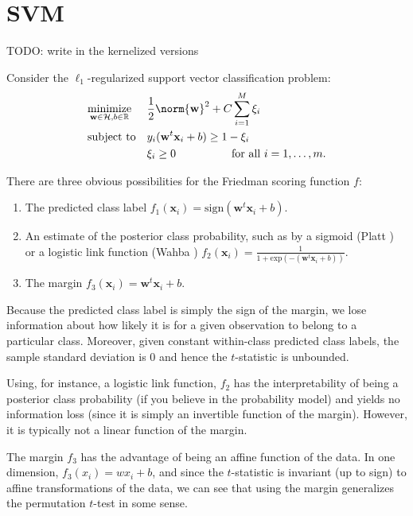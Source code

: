 \section{SVM}
TODO: write in the kernelized versions

Consider the $\ell_1$-regularized support vector classification problem:
\begin{equation*}
\begin{aligned}
& \underset{\mathbf{w} \in \mathcal{H}, b \in \mathbb{R}}{\text{minimize}}
& &\frac{1}{2}\norm{\mathbf{w}}^2+C\sum_{i=1}^M \xi_i \\
& \text{subject to}
& & y_i(\mathbf{w}^t \mathbf{x}_i + b) \geq 1 - \xi_i \\
&&& \xi_i \geq 0 \qquad \qquad \quad \text{for all } i=1,\ldots,m.
\end{aligned}
\end{equation*}

There are three obvious possibilities for the Friedman scoring
function $f$: 
\begin{enumerate}
\item The predicted class label $f_1(\mathbf{x}_i)
= \text{sign}(\mathbf{w}^t \mathbf{x}_i + b)$.
\item An estimate of the posterior class probability, such as by a
sigmoid (Platt \cite{platt1999probabilistic, lin2007note}) or a
logistic link function (Wahba \cite{wahba1992multivariate,
wahba1999support}) 
$f_2(\mathbf{x}_i) = \frac{1}{1 + \text{exp}(-(\mathbf{w}^t \mathbf{x}_i + b))}$.
\item The margin $f_3(\mathbf{x}_i) = \mathbf{w}^t \mathbf{x}_i + b$.
\end{enumerate}

Because the predicted class label is simply the sign of the margin, we
lose information about how likely it is for a given observation
to belong to a particular class.  Moreover, given constant within-class
predicted class labels, the sample standard deviation is $0$ and hence
the $t$-statistic is unbounded.

Using, for instance, a logistic link function, $f_2$ has the
interpretability of being a posterior class probability (if you
believe in the probability model) and yields no information loss
(since it is simply an invertible function of the margin).  However,
it is typically not a linear function of the margin.

The margin $f_3$ has the advantage of being an affine function of the
data.  In one dimension, $f_3(x_i) = w x_i + b$, and since the
$t$-statistic is invariant (up to sign) to affine transformations of
the data, we can see that using the margin generalizes the permutation
$t$-test in some sense.  


